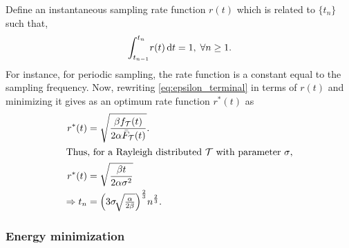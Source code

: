 Define an instantaneous sampling rate function $r(t)$ which is related to $\{t_n\}$ such that,
\begin{alignat}{1}
{\int_{t_{n-1}}^{t_n}}r(t)\,\mathrm{d} t=1,\;\forall n\geq1.\label{rt}
\end{alignat}
For instance, for periodic sampling, the rate function is a constant equal to the sampling frequency. 
Now, rewriting \cref{eq:epsilon_terminal} in terms of $r(t)$ and minimizing it gives as an optimum rate function $r^*(t)$ as
\begin{alignat}{1}
r^*(t)&=\sqrt{\dfrac{\beta f_\mathcal{T}(t)}{2\alpha\bar{F}_\mathcal{T}(t)}}.\nonumber\\
\intertext{Thus, for a Rayleigh distributed $\mathcal{T}$ with parameter $\sigma$,}
r^*(t)&=\sqrt{\dfrac{\beta t}{2\alpha\sigma^2}}\nonumber\\
\Rightarrow t_n&=\Big(3\sigma\!\sqrt{\tfrac{\alpha}{2\beta}}\Big)^{\frac{2}{3}}n^{\frac{2}{3}}.\label{tn_approx_rayleigh}
\end{alignat}

\subsubsection{Energy minimization}\label{sec:aprxSol_Energy}

